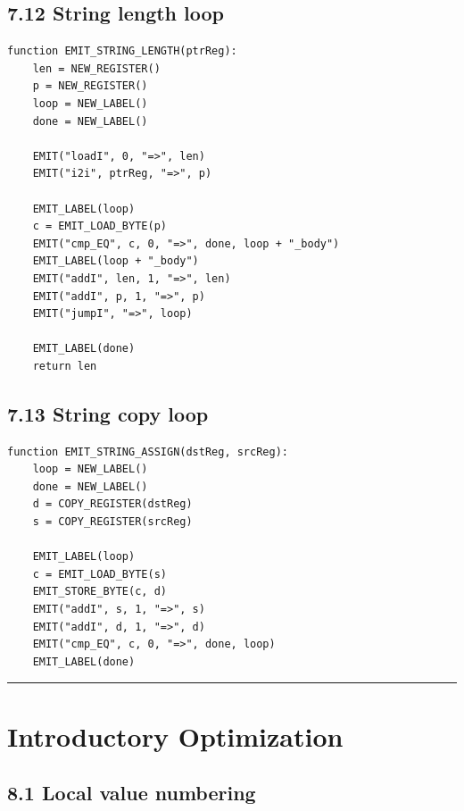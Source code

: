\documentclass[10pt,letterpaper]{article}
\begin{document}
\subsection*{7.12 String length loop}

\begin{verbatim}
function EMIT_STRING_LENGTH(ptrReg):
    len = NEW_REGISTER()
    p = NEW_REGISTER()
    loop = NEW_LABEL()
    done = NEW_LABEL()

    EMIT("loadI", 0, "=>", len)
    EMIT("i2i", ptrReg, "=>", p)

    EMIT_LABEL(loop)
    c = EMIT_LOAD_BYTE(p)
    EMIT("cmp_EQ", c, 0, "=>", done, loop + "_body")
    EMIT_LABEL(loop + "_body")
    EMIT("addI", len, 1, "=>", len)
    EMIT("addI", p, 1, "=>", p)
    EMIT("jumpI", "=>", loop)

    EMIT_LABEL(done)
    return len
\end{verbatim}

\subsection*{7.13 String copy loop}

\begin{verbatim}
function EMIT_STRING_ASSIGN(dstReg, srcReg):
    loop = NEW_LABEL()
    done = NEW_LABEL()
    d = COPY_REGISTER(dstReg)
    s = COPY_REGISTER(srcReg)

    EMIT_LABEL(loop)
    c = EMIT_LOAD_BYTE(s)
    EMIT_STORE_BYTE(c, d)
    EMIT("addI", s, 1, "=>", s)
    EMIT("addI", d, 1, "=>", d)
    EMIT("cmp_EQ", c, 0, "=>", done, loop)
    EMIT_LABEL(done)
\end{verbatim}

\medskip\hrule\medskip

\clearpage
\section{Introductory Optimization}

\subsection*{8.1 Local value numbering}
\end{document}
